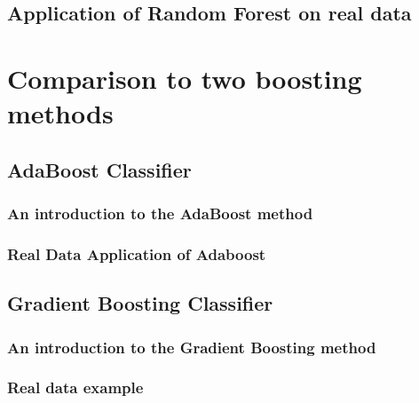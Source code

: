 \subsection{Application of Random Forest on real data}
\label{sec:real_data}



\section{Comparison to two boosting methods}


\subsection{AdaBoost Classifier}
\label{sec:adaboost}

\subsubsection{An introduction to the AdaBoost method}


\subsubsection{Real Data Application of Adaboost}

\subsection{Gradient Boosting Classifier}
\label{sec:gradient_boosting}

\subsubsection{An introduction to the Gradient Boosting method}

\subsubsection{Real data example}
